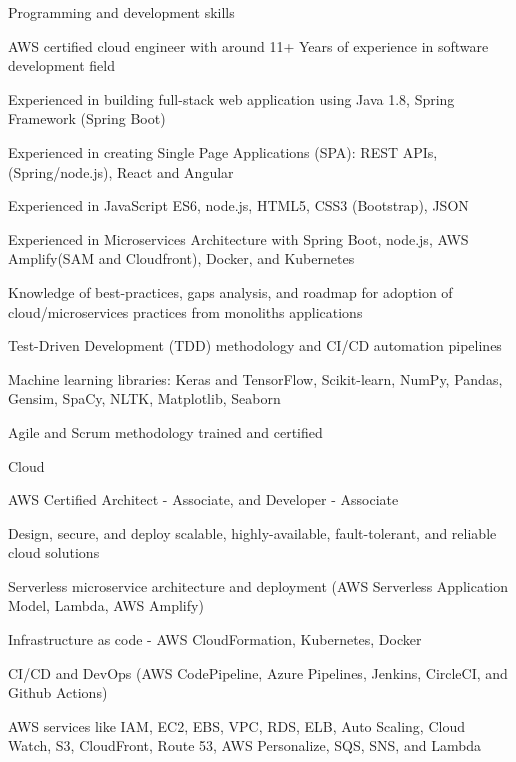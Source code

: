 \begin{cventries}
  \cventry
    {Programming and development skills}
    {}
    {}
    {}
    {
      \begin{cvitems}
        \item { AWS certified cloud engineer with around 11+ Years of experience in software development field}
        \item {Experienced in building full-stack web application using Java 1.8, Spring Framework (Spring Boot)}
        \item {Experienced in creating Single Page Applications (SPA): REST APIs, (Spring/node.js), React and Angular}
        \item {Experienced in JavaScript ES6, node.js, HTML5, CSS3 (Bootstrap), JSON} 
        \item {Experienced in Microservices Architecture with Spring Boot, node.js, AWS Amplify(SAM and Cloudfront), Docker, and Kubernetes }
        \item {Knowledge of best-practices, gaps analysis, and roadmap for adoption of cloud/microservices practices from monoliths applications }
        \item {Test-Driven Development (TDD) methodology and CI/CD automation pipelines}
        \item {Machine learning libraries: Keras and TensorFlow, Scikit-learn, NumPy, Pandas, Gensim, SpaCy, NLTK, Matplotlib, Seaborn }
        \item {Agile and Scrum methodology trained and certified}
      \end{cvitems}
    }
    
\vspace{-1em}

    \cventry
    {Cloud}
    {}
    {}
    {}
    {
      \begin{cvitems}
        \item {AWS Certified Architect - Associate, and Developer - Associate }
        \item {Design, secure, and deploy scalable, highly-available, fault-tolerant, and reliable cloud solutions}
        \item {Serverless microservice architecture and deployment (AWS Serverless Application Model, Lambda, AWS Amplify) }
        \item {Infrastructure as code - AWS CloudFormation, Kubernetes, Docker }
        \item {CI/CD and DevOps (AWS CodePipeline, Azure Pipelines, Jenkins, CircleCI, and Github Actions)}
        \item { AWS services like IAM, EC2, EBS, VPC, RDS, ELB, Auto Scaling, Cloud Watch, S3, CloudFront, Route 53, AWS Personalize, SQS, SNS, and Lambda }
      \end{cvitems}
    }
    

\end{cventries}
